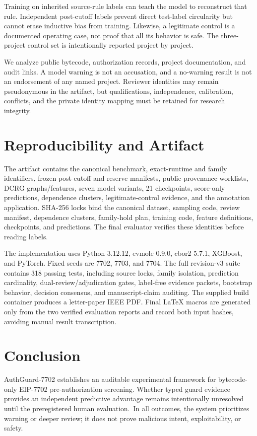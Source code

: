 \documentclass[conference]{IEEEtran}
\newcommand{\pending}[1]{\textcolor{red}{\textbf{[#1]}}}
\newif\ifresultsready
\begin{document}
Training on inherited source-rule labels can teach the model to reconstruct that rule. Independent
post-cutoff labels prevent direct test-label circularity but cannot erase inductive bias from
training. Likewise, a legitimate control is a documented operating case, not proof that all its
behavior is safe. The three-project control set is intentionally reported project by project.

We analyze public bytecode, authorization records, project documentation, and audit links. A model
warning is not an accusation, and a no-warning result is not an endorsement of any named project.
Reviewer identities may remain pseudonymous in the artifact, but qualifications, independence,
calibration, conflicts, and the private identity mapping must be retained for research integrity.

\section{Reproducibility and Artifact}

The artifact contains the canonical benchmark, exact-runtime and family identifiers, frozen
post-cutoff and reserve manifests, public-provenance worklists, DCRG graphs/features, seven model
variants, 21 checkpoints, score-only predictions, dependence clusters, legitimate-control
evidence, and the annotation application. SHA-256 locks bind the canonical dataset, sampling code,
review manifest, dependence clusters, family-hold plan, training code, feature definitions,
checkpoints, and predictions. The final evaluator verifies these identities before reading labels.

The implementation uses Python 3.12.12, evmole 0.9.0, cbor2 5.7.1, XGBoost, and PyTorch. Fixed seeds
are 7702, 7703, and 7704. The full revision-v3 suite contains 318 passing tests, including source
locks, family isolation, prediction cardinality, dual-review/adjudication gates, label-free evidence
packets, bootstrap behavior, decision consensus, and manuscript-claim auditing. The supplied build
container produces a letter-paper IEEE PDF. Final LaTeX macros are generated only from the two
verified evaluation reports and record both input hashes, avoiding manual result transcription.

\section{Conclusion}

AuthGuard-7702 establishes an auditable experimental framework for bytecode-only EIP-7702
pre-authorization screening. \ifresultsready \pending{INSERT THE SUPPORTED METHOD OR MEASUREMENT
CONCLUSION ONLY.} \else Whether typed guard evidence provides an independent predictive advantage
remains intentionally unresolved until the preregistered human evaluation.\fi\ In all outcomes, the
system prioritizes warning or deeper review; it does not prove malicious intent, exploitability, or
safety.



\end{document}
